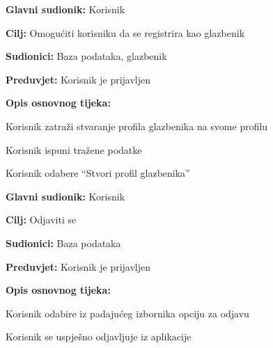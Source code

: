 			\noindent {}
			\begin{packed_item}
				
				\item \textbf{Glavni sudionik: } Korisnik
				\item  \textbf{Cilj:} Omogućiti korisniku da se registrira kao glazbenik 
				\item  \textbf{Sudionici:} Baza podataka, glazbenik
				\item  \textbf{Preduvjet:} Korisnik je prijavljen
				\item  \textbf{Opis osnovnog tijeka:} 
				
				\item[] \begin{packed_enum}
					
					\item Korisnik zatraži stvaranje profila glazbenika na svome profilu
					\item Korisnik ispuni tražene podatke
					\item Korisnik odabere “Stvori profil glazbenika”
			
				\end{packed_enum}
			\end{packed_item}	
		
		   \noindent \underbar{\textbf{UC18 - Odjava}}
		   \begin{packed_item}
		   	
		   	\item \textbf{Glavni sudionik: } Korisnik
		   	\item  \textbf{Cilj:} Odjaviti se
		   	\item  \textbf{Sudionici:} Baza podataka
		   	\item  \textbf{Preduvjet:} Korisnik je prijavljen
		   	\item  \textbf{Opis osnovnog tijeka:} 
		   	
		   	\item[] \begin{packed_enum}
		   		
		   		\item Korisnik odabire iz padajućeg izbornika opciju za odjavu
		   		\item Korisnik se uspješno odjavljuje iz aplikacije
		   		
		   	\end{packed_enum}
		   \end{packed_item}	 
		
		
				
